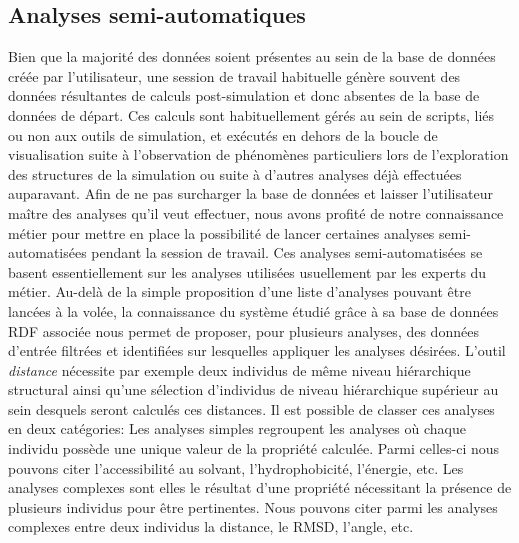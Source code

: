 \subsection{Analyses semi-automatiques}

Bien que la majorité des données soient présentes au sein de la base de données créée par l'utilisateur, une session de travail habituelle génère souvent des données résultantes de calculs post-simulation et donc absentes de la base de données de départ. Ces calculs sont habituellement gérés au sein de scripts, liés ou non aux outils de simulation, et exécutés en dehors de la boucle de visualisation suite à l'observation de phénomènes particuliers lors de l'exploration des structures de la simulation ou suite à d'autres analyses déjà effectuées auparavant. Afin de ne pas surcharger la base de données et laisser l'utilisateur maître des analyses qu'il veut effectuer, nous avons profité de notre connaissance métier pour mettre en place la possibilité de lancer certaines analyses semi-automatisées pendant la session de travail. Ces analyses semi-automatisées se basent essentiellement sur les analyses utilisées usuellement par les experts du métier. Au-delà de la simple proposition d'une liste d'analyses pouvant être lancées à la volée, la connaissance du système étudié grâce à sa base de données RDF associée nous permet de proposer, pour plusieurs analyses, des données d'entrée filtrées et identifiées sur lesquelles appliquer les analyses désirées. L'outil \textit{distance} nécessite par exemple deux individus de même niveau hiérarchique structural ainsi qu'une sélection d'individus de niveau hiérarchique supérieur au sein desquels seront calculés ces distances. Il est possible de classer ces analyses en deux catégories: Les analyses simples regroupent les analyses où chaque individu possède une unique valeur de la propriété calculée. Parmi celles-ci nous pouvons citer l'accessibilité au solvant, l'hydrophobicité, l'énergie, etc. 
Les analyses complexes sont elles le résultat d'une propriété nécessitant la présence de plusieurs individus pour être pertinentes. Nous pouvons citer parmi les analyses complexes entre deux individus la distance, le RMSD, l'angle, etc.

